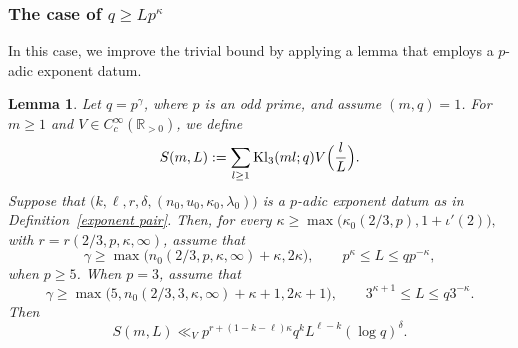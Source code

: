 \documentclass[11pt,reqno]{amsart}
\numberwithin{equation}{section}
\theoremstyle{plain}
\newtheorem{lemma}{Lemma}[section]
\theoremstyle{definition}
\newcommand{\Kl}{\mathrm{Kl}}
\begin{document}
\subsubsection{The case of $q \geq Lp^{\kappa}$}
In this case, we improve the trivial bound by applying a lemma that employs a $p$-adic exponent datum.
\begin{lemma}\label{Kloosterman sums bound}
Let $q=p^\gamma$, where $p$ is an odd prime, 
and assume $(m,q)=1$. For $m\geq1$ and $V\in C_c^\infty(\mathbb{R}_{>0})$, we define 
$$
S(m,L):=\sum_{l\geq 1}\Kl_3(ml;q)V\Bigl(\frac{l}{L}\Bigr).
$$
Suppose that $ \bigl(k,\ell,r,\delta,(n_0,u_0,\kappa_0,\lambda_0)\bigr) $ 
is a $ p $-adic exponent datum as in Definition~\ref{exponent pair}. 
Then, for every $\kappa\geq
\max\big(\kappa_0(2/3,p), 1+\iota'(2)\big),$
with $r=r(2/3,p,\kappa,\infty)$, assume that
\begin{equation*}
\gamma\geq\max\big(n_0(2/3,p,\kappa,\infty)+\kappa,2\kappa\big),\qquad
p^\kappa\leq L\leq qp^{-\kappa},
\end{equation*}
when $p\geq5$.
When $p=3$, assume that
$$
\gamma\geq\max\big(5,n_0(2/3,3,\kappa,\infty)+\kappa+1,2\kappa+1\big),\qquad
3^{\kappa+1}\leq L\leq q3^{-\kappa}.
$$
Then
$$
S(m,L)\ll_Vp^{r+(1-k-\ell)\kappa}q^kL^{\ell-k}(\log q)^\delta.
$$
\end{lemma}
\end{document}
